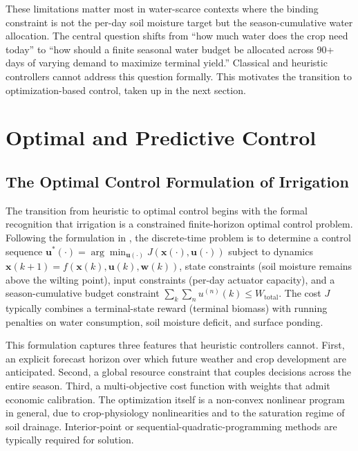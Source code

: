These limitations matter most in water-scarce contexts where the
binding constraint is not the per-day soil moisture target but the
season-cumulative water allocation. The central question shifts from
``how much water does the crop need today'' to ``how should a finite
seasonal water budget be allocated across 90+ days of varying demand
to maximize terminal yield.'' Classical and heuristic controllers
cannot address this question formally. This motivates the transition
to optimization-based control, taken up in the next section.

\section{Optimal and Predictive Control}
\label{sec:lit-mpc}

\subsection{The Optimal Control Formulation of Irrigation}
\label{ssec:lit-ocp}

The transition from heuristic to optimal control begins with the
formal recognition that irrigation is a constrained finite-horizon
optimal control problem. Following the formulation in
\cite{LopezJimenez2022,Lopezjimenez2024}, the discrete-time problem
is to determine a control sequence
$\mathbf{u}^*(\cdot) = \arg\min_{\mathbf{u}(\cdot)} J(\mathbf{x}(\cdot), \mathbf{u}(\cdot))$
subject to dynamics
$\mathbf{x}(k+1) = f(\mathbf{x}(k), \mathbf{u}(k), \mathbf{w}(k))$,
state constraints (soil moisture remains above the wilting point),
input constraints (per-day actuator capacity), and a season-cumulative
budget constraint
$\sum_k \sum_n u^{(n)}(k) \leq W_{\mathrm{total}}$.
The cost $J$ typically combines a terminal-state reward (terminal
biomass) with running penalties on water consumption, soil moisture
deficit, and surface ponding.

This formulation captures three features that heuristic controllers
cannot. First, an explicit forecast horizon over which future weather
and crop development are anticipated. Second, a global resource
constraint that couples decisions across the entire season. Third, a
multi-objective cost function with weights that admit economic
calibration. The optimization itself is a non-convex nonlinear
program in general, due to crop-physiology nonlinearities and to the
saturation regime of soil drainage. Interior-point or
sequential-quadratic-programming methods are typically required for
solution.

